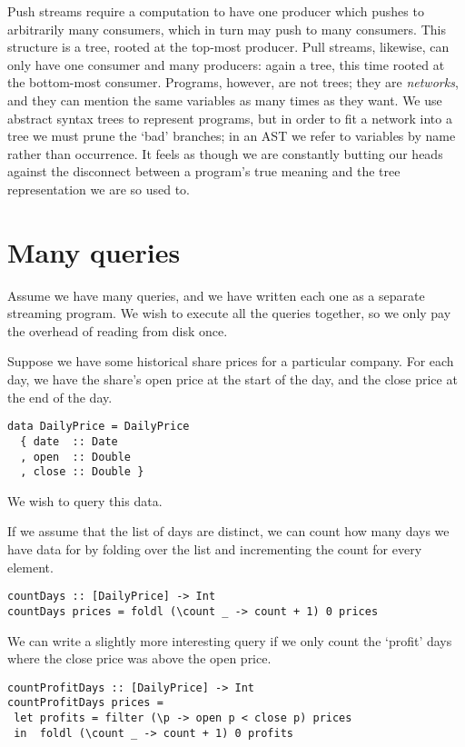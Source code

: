 Push streams require a computation to have one producer which pushes to arbitrarily many consumers, which in turn may push to many consumers.
This structure is a tree, rooted at the top-most producer.
Pull streams, likewise, can only have one consumer and many producers: again a tree, this time rooted at the bottom-most consumer.
Programs, however, are not trees; they are \emph{networks}, and they can mention the same variables as many times as they want.
We use abstract syntax trees to represent programs, but in order to fit a network into a tree we must prune the `bad' branches; in an AST we refer to variables by name rather than occurrence.
It feels as though we are constantly butting our heads against the disconnect between a program's true meaning and the tree representation we are so used to.


\section{Many queries}

Assume we have many queries, and we have written each one as a separate streaming program.
We wish to execute all the queries together, so we only pay the overhead of reading from disk once.

Suppose we have some historical share prices for a particular company.
For each day, we have the share's open price at the start of the day, and the close price at the end of the day.

\begin{lstlisting}
data DailyPrice = DailyPrice
  { date  :: Date
  , open  :: Double
  , close :: Double }
\end{lstlisting}

We wish to query this data.

If we assume that the list of days are distinct, we can count how many days we have data for by folding over the list and incrementing the count for every element.

\begin{lstlisting}
countDays :: [DailyPrice] -> Int
countDays prices = foldl (\count _ -> count + 1) 0 prices
\end{lstlisting}

We can write a slightly more interesting query if we only count the `profit' days where the close price was above the open price.

\begin{lstlisting}
countProfitDays :: [DailyPrice] -> Int
countProfitDays prices =
 let profits = filter (\p -> open p < close p) prices
 in  foldl (\count _ -> count + 1) 0 profits
\end{lstlisting}

